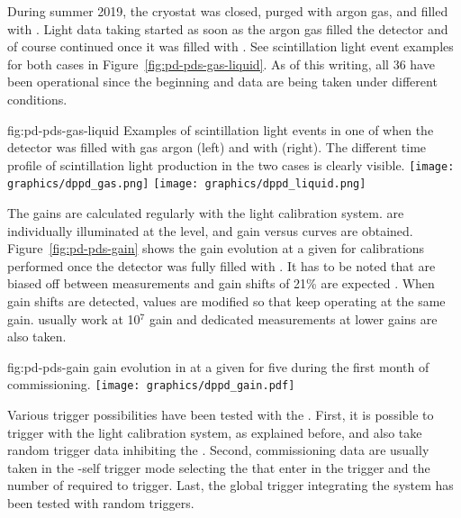 During summer 2019, the  cryostat was closed, purged with argon gas, and filled with . Light data taking started %
as soon as the argon gas filled the detector and of course continued once it was filled with  . See scintillation light event examples for both cases in Figure~\ref{fig:pd-pds-gas-liquid}. As of this writing, all 36  have been operational since the beginning and data are being taken under different conditions.

\begin{dunefigure}{fig:pd-pds-gas-liquid} {Examples of scintillation light events in one  of  when the detector was filled with gas argon (left) and with  (right). The different time profile of scintillation light production in the two cases is clearly visible.}
\texttt{[image: graphics/dppd\_gas.png]}
\texttt{[image: graphics/dppd\_liquid.png]}
\end{dunefigure}

The  gains are calculated regularly with the light calibration system.  are individually illuminated at the  level, and gain versus   curves are obtained. Figure~\ref{fig:pd-pds-gain} shows the gain evolution at a given  for calibrations performed once the detector was fully filled with . It has to be noted that  are biased off between measurements and gain shifts of 21\% are expected \cite{Belver:2018erf}. When gain shifts are detected,  values are modified so that  keep operating at the same gain.  usually work at 10$^7$ gain and dedicated measurements at lower gains are also taken.

\begin{dunefigure}{fig:pd-pds-gain} { gain evolution in  at a given  for five  during the first month of commissioning.}
\texttt{[image: graphics/dppd\_gain.pdf]}
\end{dunefigure}

Various trigger possibilities have been tested with the  . First, it is possible to trigger with the light calibration system, as explained before, and also take random trigger data inhibiting the . Second, commissioning data are usually taken in the -self trigger mode selecting the  that enter in the trigger and the number of  required to trigger. Last, the global  trigger integrating the  system has been tested with random triggers.

